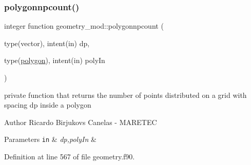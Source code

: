 \mbox{\label{namespacegeometry__mod_aaffceaeb22689f0aaee4568c662f192a}} 
\subsubsection{\texorpdfstring{polygonnpcount()}{polygonnpcount()}}
{\footnotesize\ttfamily integer function geometry\+\_\+mod\+::polygonnpcount (\begin{DoxyParamCaption}\item[{type(vector), intent(in)}]{dp,  }\item[{type(\mbox{\hyperlink{structgeometry__mod_1_1polygon}{polygon}}), intent(in)}]{poly\+In }\end{DoxyParamCaption})\hspace{0.3cm}{\ttfamily [private]}}



private function that returns the number of points distributed on a grid with spacing dp inside a polygon 

\begin{DoxyAuthor}{Author}
Ricardo Birjukovs Canelas -\/ M\+A\+R\+E\+T\+EC 
\end{DoxyAuthor}

\begin{DoxyParams}[1]{Parameters}
\mbox{\tt in}  & {\em dp,poly\+In} & \\
\hline
\end{DoxyParams}


Definition at line 567 of file geometry.\+f90.


